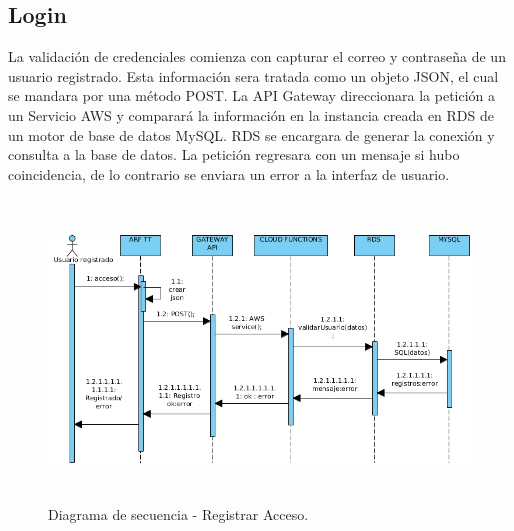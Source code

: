 \subsection{Login}
La validación de credenciales comienza con capturar el correo y contraseña  de un usuario registrado. Esta información sera tratada como un objeto JSON, el cual se mandara por una método POST. La API Gateway direccionara la petición a un Servicio AWS y  comparará la información en la instancia creada en RDS de un motor de base de datos MySQL. RDS se encargara de generar la conexión y consulta a la base de datos. La petición regresara con un mensaje si hubo coincidencia, de lo contrario se enviara un error a la interfaz de usuario.
\begin{figure}[h!]
	\centering
	\includegraphics[width=14cm,height=8cm]{imagenes/analisis/DSacceso.jpg}
	\caption{Diagrama de secuencia - Registrar Acceso.}
	\label{fig:analogo}
\end{figure} 
